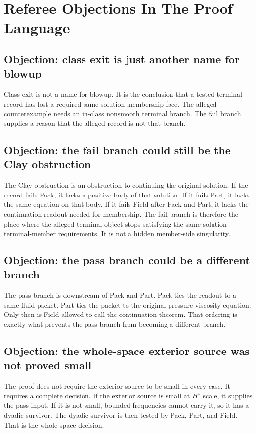 \section{Referee Objections In The Proof Language}

\subsection*{Objection: class exit is just another name for blowup}

Class exit is not a name for blowup.
It is the conclusion that a tested terminal record has lost a required same-solution membership face.
The alleged counterexample needs an in-class nonsmooth terminal branch.
The fail branch supplies a reason that the alleged record is not that branch.

\subsection*{Objection: the fail branch could still be the Clay obstruction}

The Clay obstruction is an obstruction to continuing the original solution.
If the record fails Pack, it lacks a positive body of that solution.
If it fails Part, it lacks the same equation on that body.
If it fails Field after Pack and Part, it lacks the continuation readout needed for membership.
The fail branch is therefore the place where the alleged terminal object stops satisfying the same-solution terminal-member requirements.
It is not a hidden member-side singularity.

\subsection*{Objection: the pass branch could be a different branch}

The pass branch is downstream of Pack and Part.
Pack ties the readout to a same-fluid packet.
Part ties the packet to the original pressure-viscosity equation.
Only then is Field allowed to call the continuation theorem.
That ordering is exactly what prevents the pass branch from becoming a different branch.

\subsection*{Objection: the whole-space exterior source was not proved small}

The proof does not require the exterior source to be small in every case.
It requires a complete decision.
If the exterior source is small at \(H^s\) scale, it supplies the pass input.
If it is not small, bounded frequencies cannot carry it, so it has a dyadic survivor.
The dyadic survivor is then tested by Pack, Part, and Field.
That is the whole-space decision.

